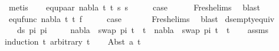 \begin{isabellebody}
\ metis\isanewline
{}\isamarkupfalse%
\isanewline
\ \ \isamarkupfalse%
\ {\isacharparenleft}{\kern0pt}equ{\isacharunderscore}{\kern0pt}paar\ nabla\ t{}\ t{}\ s{}\ s{}{\isacharparenright}{\kern0pt}\isanewline
\ \ \isamarkupfalse%
\ \isamarkupfalse%
\ {\isacharquery}{\kern0pt}case\isanewline
\ \ \ \ \isamarkupfalse%
\ Fresh{\isacharunderscore}{\kern0pt}elims{\isacharparenleft}{\kern0pt}{}{\isacharparenright}{\kern0pt}\ \isamarkupfalse%
\ blast\isanewline
{}\isamarkupfalse%
\isanewline
\ \ \isamarkupfalse%
\ {\isacharparenleft}{\kern0pt}equ{\isacharunderscore}{\kern0pt}func\ nabla\ t{}\ t{}\ f{\isacharparenright}{\kern0pt}\isanewline
\ \ \isamarkupfalse%
\ \isamarkupfalse%
\ {\isacharquery}{\kern0pt}case\ \isanewline
\ \ \ \ \isamarkupfalse%
\ Fresh{\isacharunderscore}{\kern0pt}elims{\isacharparenleft}{\kern0pt}{}{\isacharparenright}{\kern0pt}\ \isamarkupfalse%
\ blast\isanewline
{}\isamarkupfalse%
%
\endisatagproof
{\isafoldproof}%
%
\isadelimproof
\isanewline
%
\endisadelimproof
\isanewline
{}\isamarkupfalse%
\ ds{\isacharunderscore}{\kern0pt}empty{\isacharunderscore}{\kern0pt}equiv{\isacharunderscore}{\kern0pt}{}{\isacharcolon}{\kern0pt}\isanewline
\ \ \ {\isachardoublequoteopen}ds\ pi{}\ pi{}\ {\isacharequal}{\kern0pt}\ {\isacharbraceleft}{\kern0pt}{\isacharbraceright}{\kern0pt}{\isachardoublequoteclose}\isanewline
\ \ \ {\isachardoublequoteopen}nabla\ {\isasymturnstile}\ swap\ pi{}\ t{}\ {\isasymapprox}\ t{}\ {\isasymLongrightarrow}\ nabla\ {\isasymturnstile}\ swap\ pi{}\ t{}\ {\isasymapprox}\ t{}{\isachardoublequoteclose}\isanewline
%
\isadelimproof
\ \ %
\endisadelimproof
%
\isatagproof
{}\isamarkupfalse%
\ assms\isanewline
{}\isamarkupfalse%
{\isacharparenleft}{\kern0pt}induction\ t{}\ arbitrary{\isacharcolon}{\kern0pt}\ t{}{\isacharparenright}{\kern0pt}\isanewline
\ \ \isamarkupfalse%
\ {\isacharparenleft}{\kern0pt}Abst\ a\ t{}{\isacharprime}{\kern0pt}{\isacharparenright}{\kern0pt}\isanewline
\ \ \isamarkupfalse%
\ \isamarkupfalse%

\end{isabellebody}
